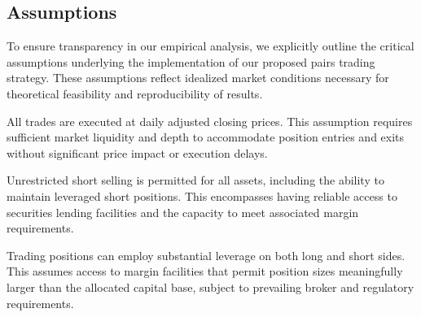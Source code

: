 \subsection{Assumptions}
To ensure transparency in our empirical analysis, we explicitly outline the critical assumptions underlying the implementation of our proposed pairs trading strategy. These assumptions reflect idealized market conditions necessary for theoretical feasibility and reproducibility of results.


\begin{assumption} \label{assum:execution}
All trades are executed at daily adjusted closing prices. This assumption requires sufficient market liquidity and depth to accommodate position entries and exits without significant price impact or execution delays.
\end{assumption}

\begin{assumption} \label{assum:shorting}
Unrestricted short selling is permitted for all assets, including the ability to maintain leveraged short positions. This encompasses having reliable access to securities lending facilities and the capacity to meet associated margin requirements.
\end{assumption}

\begin{assumption} \label{assum:leverage}
Trading positions can employ substantial leverage on both long and short sides. This assumes access to margin facilities that permit position sizes meaningfully larger than the allocated capital base, subject to prevailing broker and regulatory requirements.
\end{assumption}

%
%

